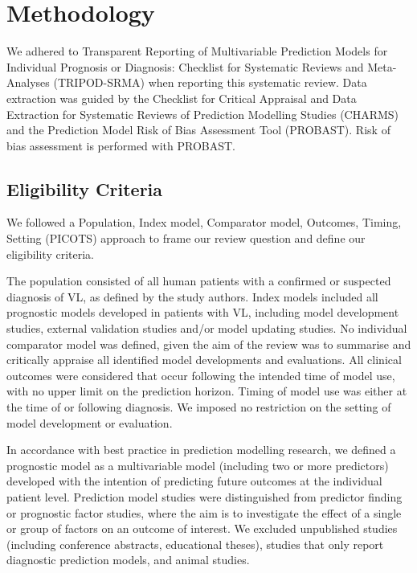 \section{Methodology}

We adhered to Transparent Reporting of Multivariable Prediction Models for Individual Prognosis or Diagnosis: Checklist for Systematic Reviews and Meta-Analyses (TRIPOD-SRMA) when reporting this systematic review\cite{snellTransparentReportingMultivariable2023}. Data extraction was guided by the Checklist for Critical Appraisal and Data Extraction for Systematic Reviews of Prediction Modelling Studies (CHARMS)\cite{moonsCriticalAppraisalData2014} and the Prediction Model Risk of Bias Assessment Tool (PROBAST)\cite{wolffPROBASTToolAssess2019,moons2019}. Risk of bias assessment is performed with PROBAST\cite{wolffPROBASTToolAssess2019}.

\subsection{Eligibility Criteria}

We followed a Population, Index model, Comparator model, Outcomes, Timing, Setting (PICOTS) approach to frame our review question and define our eligibility criteria\cite{moonsCriticalAppraisalData2014,debray2017}.

The population consisted of all human patients with a confirmed or suspected diagnosis of VL, as defined by the study authors. Index models included all prognostic models developed in patients with VL, including model development studies, external validation studies and/or model updating studies. No individual comparator model was defined, given the aim of the review was to summarise and critically appraise all identified model developments and evaluations. All clinical outcomes were considered that occur following the intended time of model use, with no upper limit on the prediction horizon. Timing of model use was either at the time of or following diagnosis. We imposed no restriction on the setting of model development or evaluation.

In accordance with best practice in prediction modelling research\cite{steyerbergPrognosisResearchStrategy2013,wolffPROBASTToolAssess2019,collins2015}, we defined a prognostic model as a multivariable model (including two or more predictors) developed with the intention of predicting future outcomes at the individual patient level. Prediction model studies were distinguished from predictor finding or prognostic factor studies, where the aim is to investigate the effect of a single or group of factors on an outcome of interest\cite{rileyGuideSystematicReview2019}. We excluded unpublished studies (including conference abstracts, educational theses), studies that only report diagnostic prediction models, and animal studies.

